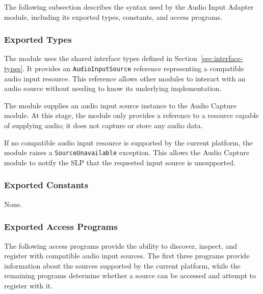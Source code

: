 \documentclass[12pt, titlepage]{article}
\begin{document}
The following subsection describes the syntax used by the Audio Input Adapter module, including its exported types, constants, and access programs.

\subsubsection{Exported Types}

The module uses the shared interface types defined in Section~\ref{sec:interface-types}. It provides an \texttt{AudioInputSource} reference representing a compatible audio input resource. This reference allows other modules to interact with an audio source without needing to know its underlying implementation.

The module supplies an audio input source instance to the Audio Capture module. At this stage, the module only provides a reference to a resource capable of supplying audio; it does not capture or store any audio data.

If no compatible audio input resource is supported by the current platform, the module raises a \texttt{SourceUnavailable} exception. This allows the Audio Capture module to notify the SLP that the requested input source is unsupported.

\subsubsection{Exported Constants}

None.

\subsubsection{Exported Access Programs}

The following access programs provide the ability to discover, inspect, and register with compatible audio input sources. The first three programs provide information about the sources supported by the current platform, while the remaining programs determine whether a source can be accessed and attempt to register with it.
\end{document}

